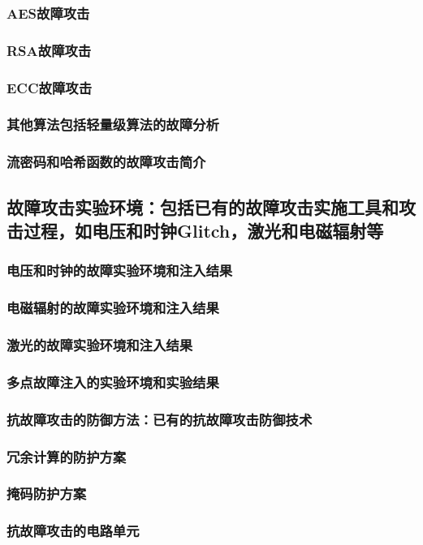 \documentclass[a4paper,12pt]{article}
\begin{document}
\begin{CJK}{UTF8}{gkai}
\subsubsection{AES故障攻击}
\subsubsection{RSA故障攻击}
\subsubsection{ECC故障攻击}
\subsubsection{其他算法包括轻量级算法的故障分析}
\subsubsection{流密码和哈希函数的故障攻击简介}
\subsection{故障攻击实验环境：包括已有的故障攻击实施工具和攻击过程，如电压和时钟Glitch，激光和电磁辐射等}
\subsubsection{电压和时钟的故障实验环境和注入结果}
\subsubsection{电磁辐射的故障实验环境和注入结果}
\subsubsection{激光的故障实验环境和注入结果}
\subsubsection{多点故障注入的实验环境和实验结果}
\subsubsection{抗故障攻击的防御方法：已有的抗故障攻击防御技术}
\subsubsection{冗余计算的防护方案}
\subsubsection{掩码防护方案}
\subsubsection{抗故障攻击的电路单元}
\end{CJK}
\end{document}
